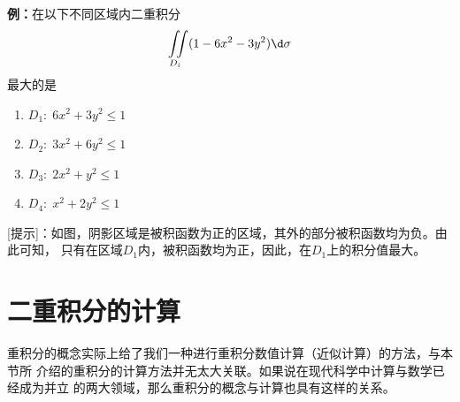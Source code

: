 {\bf 例：}在以下不同区域内二重积分
$$\iint\limits_{D_i}(1-6x^2-3y^2)\d\sigma$$
最大的是
\begin{enumerate}[(1)]
  \setlength{\itemindent}{1cm}
  \item $D_1:\;6x^2+3y^2\leq 1$
  \item $D_2:\;3x^2+6y^2\leq 1$
  \item $D_3:\;2x^2+y^2\leq 1$
  \item $D_4:\;x^2+2y^2\leq 1$
\end{enumerate}

\begin{center}
\end{center}

[提示]：如图，阴影区域是被积函数为正的区域，其外的部分被积函数均为负。由此可知，
只有在区域$D_1$内，被积函数均为正，因此，在$D_1$上的积分值最大。

\section{二重积分的计算}


重积分的概念实际上给了我们一种进行重积分数值计算（近似计算）的方法，与本节所
介绍的重积分的计算方法并无太大关联。如果说在现代科学中计算与数学已经成为并立
的两大领域，那么重积分的概念与计算也具有这样的关系。

